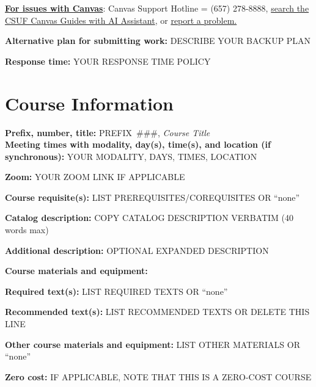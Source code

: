 \documentclass[12pt]{article}     %
\newcommand{\CourseCode}{PREFIX\ \#\#\#}
\newcommand{\CourseTitle}{Course Title}
\begin{document}
\vspace{0.5em}
\noindent \textbf{\underline{For issues with Canvas}}: Canvas Support Hotline = (657) 278-8888, \href{https://canvashelp.fullerton.edu/}{search the CSUF Canvas Guides with AI Assistant}, or \href{https://titans.service-now.com/sp?id=sc_cat_item&sys_id=f88efe80ebea6a10fb7cfcffcad0cdc6&subject=Canvas}{report a problem.}

\vspace{0.5em}
\noindent \textbf{Alternative plan for submitting work:} DESCRIBE YOUR BACKUP PLAN

\vspace{0.5em}
\noindent \textbf{Response time:} YOUR RESPONSE TIME POLICY

\section*{Course Information}
\noindent \textbf{Prefix, number, title:} \CourseCode, \textit{\CourseTitle} \\
\noindent \textbf{Meeting times with modality, day(s), time(s), and location (if synchronous):} 
YOUR MODALITY, DAYS, TIMES, LOCATION

\vspace{0.5em}
\begin{flatlist}
\item \textbf{Zoom:} YOUR ZOOM LINK IF APPLICABLE
\item \textbf{Course requisite(s):} LIST PREREQUISITES/COREQUISITES OR ``none''
\item \textbf{Catalog description:} COPY CATALOG DESCRIPTION VERBATIM (40 words max)
\item \textbf{Additional description:} OPTIONAL EXPANDED DESCRIPTION
\item \textbf{Course materials and equipment:} ~
\item \textbf{Required text(s):} LIST REQUIRED TEXTS OR ``none''
\item \textbf{Recommended text(s):} LIST RECOMMENDED TEXTS OR DELETE THIS LINE
\item \textbf{Other course materials and equipment:} LIST OTHER MATERIALS OR ``none''
\item \textbf{Zero cost:} IF APPLICABLE, NOTE THAT THIS IS A ZERO-COST COURSE
\end{flatlist}
\end{document}
